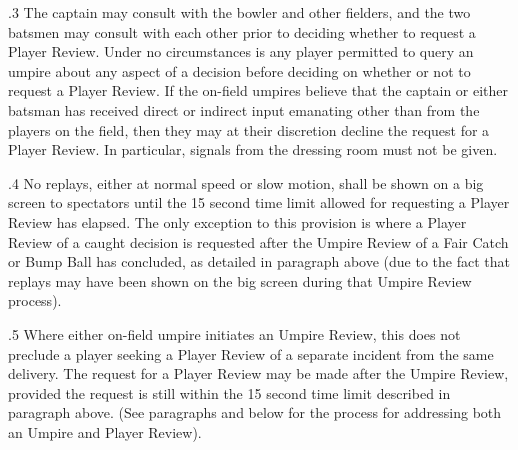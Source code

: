 \documentclass[12pt]{article}
\begin{document}
\vspace{\baselineskip}
\begin{adjustwidth}{0.5in}{0.01in}
{\fontsize{9pt}{10.8pt}.3 \tabto{0.49in} The captain may consult with the bowler and other fielders, and the two batsmen may consult with each other prior to deciding whether to request a Player Review. Under no circumstances is any player permitted to query an umpire about any aspect of a decision before deciding on whether or not to request a Player Review. If the on-field umpires believe that the captain or either batsman has received direct or indirect input emanating other than from the players on the field, then they may at their discretion decline the request for a Player Review. In particular, signals from the dressing room must not be given.\par}\par

\end{adjustwidth}


\vspace{\baselineskip}
\begin{adjustwidth}{0.5in}{0.01in}
{\fontsize{9pt}{10.8pt}.4 \tabto{0.49in} No replays, either at normal speed or slow motion, shall be shown on a big screen to spectators until the 15 second time limit allowed for requesting a Player Review has elapsed. The only exception to this provision is where a Player Review of a caught decision is requested after the Umpire Review of a Fair Catch or Bump Ball has concluded, as detailed in paragraph above (due to the fact that replays may have been shown on the big screen during that Umpire Review process).\par}\par

\end{adjustwidth}


\vspace{\baselineskip}
\begin{adjustwidth}{0.5in}{0.07in}
{\fontsize{9pt}{10.8pt}.5 \tabto{0.49in} Where either on-field umpire initiates an Umpire Review, this does not preclude a player seeking a Player Review of a separate incident from the same delivery. The request for a Player Review may be made after the Umpire Review, provided the request is still within the 15 second time limit described in paragraph  above. (See paragraphs and below for the process for addressing both an Umpire and Player Review).\par}\par

\end{adjustwidth}
\end{document}
